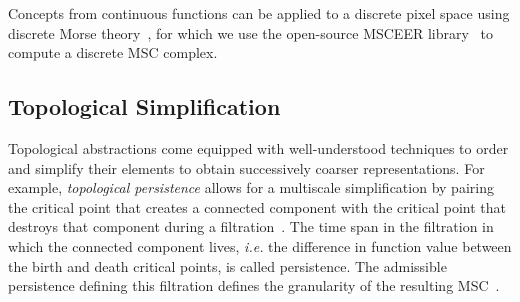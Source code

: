 %  
%
Concepts from continuous functions can be applied to a discrete pixel space using discrete Morse theory~\cite{formanMorse}, for which we use the open-source MSCEER library~\cite{MSCEER} to compute a discrete MSC complex. 

\vspace{-.3cm}

\subsection{Topological Simplification}
\label{ssec:pers}
Topological abstractions come equipped with well-understood techniques to order and simplify their elements to obtain successively coarser representations. For example, \textit{topological persistence} allows for a multiscale simplification by pairing the critical point that creates a connected component with the critical point that destroys that component during a filtration~\cite{edelsbrunner2000topological}. The time span in the filtration in which the connected component lives, \textit{i.e.} the difference in function value between the birth and death critical points, is called persistence. The admissible persistence defining this filtration defines the granularity of the resulting MSC~\cite{edelsbrunner2000topological, bremer2003, gyulassy2006topo}. 




 

\fi
